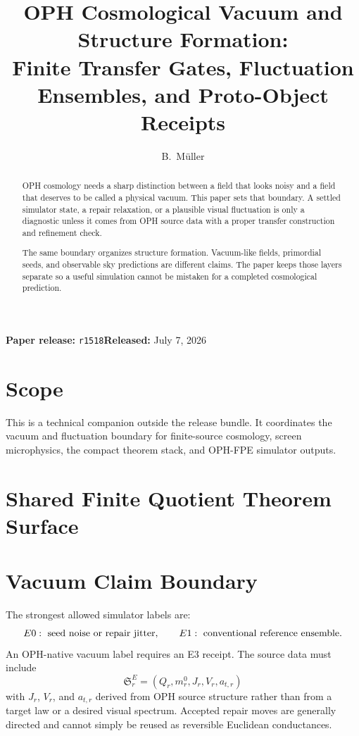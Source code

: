 \documentclass[11pt]{article}
\title{OPH Cosmological Vacuum and Structure Formation:\\
Finite Transfer Gates, Fluctuation Ensembles, and Proto-Object Receipts}
\author{B.\ M\"uller}
\date{\OPHPaperReleaseDate}
\newcommand{\OPHPaperReleaseID}{r1518}
\newcommand{\OPHPaperReleaseDate}{July 7, 2026}
\newcommand{\OPHPaperReleaseBanner}{%
      \begin{center}
      \small\textbf{Paper release:} \texttt{\OPHPaperReleaseID}\quad\textbf{Released:} \OPHPaperReleaseDate
      \end{center}}
\theoremstyle{remark}
\theoremstyle{plain}
\begin{document}
\maketitle
\OPHPaperReleaseBanner

\begin{abstract}
OPH cosmology needs a sharp distinction between a field that looks noisy and a
field that deserves to be called a physical vacuum. This paper sets that
boundary. A settled simulator state, a repair relaxation, or a plausible visual
fluctuation is only a diagnostic unless it comes from OPH source data with a
proper transfer construction and refinement check.

The same boundary organizes structure formation. Vacuum-like fields, primordial
seeds, and observable sky predictions are different claims. The paper keeps
those layers separate so a useful simulation cannot be mistaken for a completed
cosmological prediction.
\end{abstract}

\section{Scope}

This is a technical companion outside the release bundle. It coordinates the
vacuum and fluctuation boundary for finite-source cosmology, screen
microphysics, the compact theorem stack, and OPH-FPE simulator outputs.

\section{Shared Finite Quotient Theorem Surface}



\section{Vacuum Claim Boundary}

The strongest allowed simulator labels are:
\[
E0:\hbox{ seed noise or repair jitter},\qquad
E1:\hbox{ conventional reference ensemble}.
\]
An OPH-native vacuum label requires an E3 receipt.  The source data must include
\[
\mathfrak S_r^E=(Q_r,m_r^0,J_r,V_r,a_{t,r})
\]
with \(J_r\), \(V_r\), and \(a_{t,r}\) derived from OPH source structure rather than from a target
law or a desired visual spectrum.  Accepted repair moves are generally directed and cannot simply
be reused as reversible Euclidean conductances.
\end{document}
